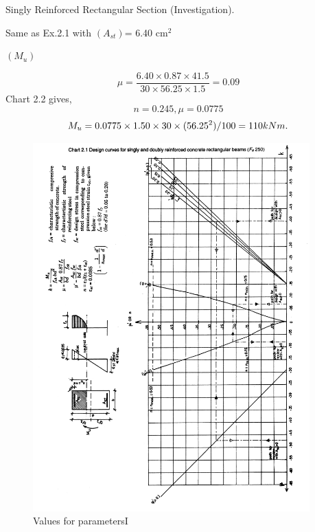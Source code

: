 \begin{example} Singly Reinforced Rectangular Section (Investigation).

\given Same as Ex.2.1 with $(A_{st})$= 6.40 cm$^{2}$

\required $(M_{u})$

\solution
$$\mu=\frac{6.40 \times 0.87 \times 41.5}{30 \times 56.25 \times 1.5} =0.09$$
Chart 2.2 gives,
$$n=0.245, \mu=0.0775$$
$$M_{u}=0.0775 \times 1.50 \times 30 \times (56.25^2)/100= 110kNm.$$
\end{example}
\newpage
\begin{figure}
\centering
\includegraphics[width=0.95\textwidth]{images/ch2-5.png}
\caption{Values for parametersI}
\label{Values for parametersI}
\end{figure}
\newpage
